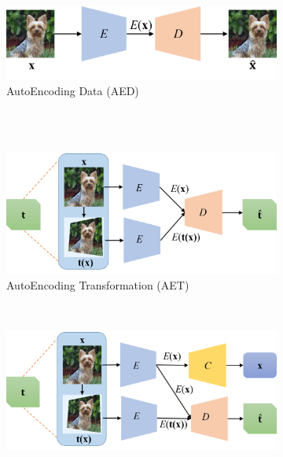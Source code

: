 \documentclass[10pt,journal,compsoc,twoside]{IEEEtran}
\begin{document}
\begin{figure}[t]
    \centering
    \begin{subfigure}[c]{0.33\textwidth}
        \includegraphics[width=\textwidth]{Figures/AED.png}
        \caption{AutoEncoding Data (AED)}
    \end{subfigure}\\\vspace{2mm}
    ~ %
    \begin{subfigure}[c]{0.33\textwidth}
        \includegraphics[width=\textwidth]{Figures/AET.png}
        \caption{AutoEncoding Transformation (AET)}
    \end{subfigure}\\\vspace{2mm}
    \begin{subfigure}[c]{0.33\textwidth}
        \includegraphics[width=\textwidth]{Figures/SAT.png}

\end{subfigure}
\end{figure}
\end{document}
